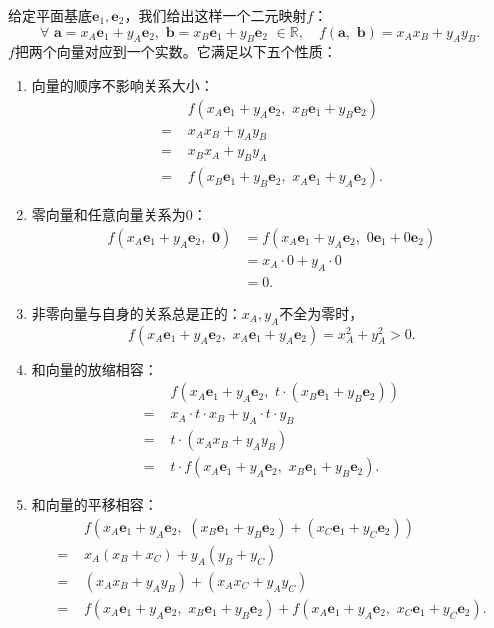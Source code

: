 \documentclass[12pt,UTF8]{ctexbook}
\begin{document}
给定平面基底$\mathbf{e}_1, \mathbf{e}_2$，我们给出这样一个二元映射$f$：
$$ \forall \,\, \mathbf{a} = x_A\mathbf{e}_1 + y_A\mathbf{e}_2, \,\, \mathbf{b} = x_B\mathbf{e}_1 + y_B\mathbf{e}_2 \,\, \in \mathbb{R}, \quad f(\mathbf{a}, \,\, \mathbf{b}) = x_Ax_B + y_Ay_B.$$
$f$把两个向量对应到一个实数。它满足以下五个性质：
\begin{enumerate}
    \item 向量的顺序不影响关系大小：
    \begin{align*}
          & f(x_A\mathbf{e}_1 + y_A\mathbf{e}_2,\,\, x_B\mathbf{e}_1 + y_B\mathbf{e}_2)  \\
        =\,\,& x_Ax_B + y_A y_B  \\
        =\,\,& x_Bx_A + y_By_A  \\
        =\,\,& f(x_B\mathbf{e}_1 + y_B\mathbf{e}_2,\,\, x_A\mathbf{e}_1 + y_A\mathbf{e}_2). 
    \end{align*}
    \item 零向量和任意向量关系为$0$：
    \begin{align*}
        f(x_A\mathbf{e}_1 + y_A\mathbf{e}_2,\,\, \mathbf{0}) &= f(x_A\mathbf{e}_1 + y_A\mathbf{e}_2,\,\, 0\mathbf{e}_1 + 0\mathbf{e}_2)  \\
        &= x_A\cdot 0 + y_A\cdot 0  \\
        &= 0. 
    \end{align*}
    $$$$
    \item 非零向量与自身的关系总是正的：$x_A, y_A$不全为零时，
    $$f(x_A\mathbf{e}_1 + y_A\mathbf{e}_2,\,\, x_A\mathbf{e}_1 + y_A\mathbf{e}_2) = x_A^2 + y_A^2  > 0.$$
    \item 和向量的放缩相容：
    \begin{align*}
        & f(x_A\mathbf{e}_1 + y_A\mathbf{e}_2,\,\, t\cdot (x_B\mathbf{e}_1 + y_B\mathbf{e}_2))  \\
        =\,\,& x_A\cdot t\cdot x_B + y_A\cdot t\cdot y_B  \\
        =\,\,& t\cdot (x_Ax_B + y_Ay_B)  \\
        =\,\,& t\cdot f(x_A\mathbf{e}_1 + y_A\mathbf{e}_2,\,\, x_B\mathbf{e}_1 + y_B\mathbf{e}_2).  
    \end{align*}
    \item 和向量的平移相容：
    \begin{align*}
         & f(x_A\mathbf{e}_1 + y_A\mathbf{e}_2, \,\, (x_B\mathbf{e}_1 + y_B\mathbf{e}_2) + (x_C\mathbf{e}_1 + y_C\mathbf{e}_2))  \\
         =\,\,& x_A(x_B + x_C) + y_A (y_B + y_C)  \\
         =\,\,& (x_Ax_B + y_Ay_B) + (x_Ax_C + y_Ay_C)  \\
         =\,\,& f(x_A\mathbf{e}_1 + y_A\mathbf{e}_2, \,\,x_B\mathbf{e}_1 + y_B\mathbf{e}_2) + f(x_A\mathbf{e}_1 + y_A\mathbf{e}_2, \,\,x_C\mathbf{e}_1 + y_C\mathbf{e}_2). 
    \end{align*}     
\end{enumerate}
\end{document}
